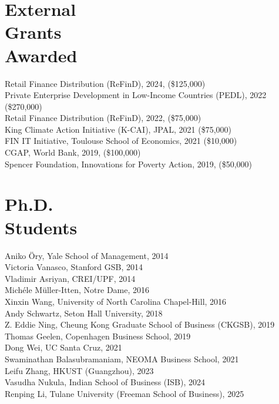 \documentclass[margin,line,11pt]{resume}
\begin{document}
\begin{resume}
        \section{\mysidestyle External \\ Grants \\ Awarded}
         Retail Finance Distribution (ReFinD), 2024, (\$125,000) \\
         Private Enterprise Development in Low-Income Countries (PEDL), 2022 (\$270,000) \\
         Retail Finance Distribution (ReFinD), 2022, (\$75,000) \\
         King Climate Action Initiative (K-CAI), JPAL, 2021 (\$75,000)  \\
         FIN IT Initiative, Toulouse School of Economics, 2021 (\$10,000)  \\
         CGAP, World Bank, 2019, (\$100,000)\\
         Spencer Foundation, Innovations for Poverty Action, 2019, (\$50,000)


\section{\mysidestyle Ph.D. \\ Students} 
Aniko \"{O}ry, Yale School of Management, 2014 \\
Victoria Vanasco, Stanford GSB, 2014 \\
Vladimir Asriyan, CREI/UPF, 2014 \\
Mich\'{e}le M\"{u}ller-Itten, Notre Dame, 2016 \\
Xinxin Wang, University of North Carolina Chapel-Hill, 2016 \\
Andy Schwartz, Seton Hall University, 2018 \\
Z. Eddie Ning, Cheung Kong Graduate School of Business (CKGSB), 2019 \\
Thomas Geelen, Copenhagen Business School, 2019 \\
Dong Wei, UC Santa Cruz, 2021 \\
Swaminathan Balasubramaniam, NEOMA Business School, 2021 \\
Leifu Zhang, HKUST (Guangzhou), 2023 \\
Vasudha Nukula, Indian School of Business (ISB), 2024 \\
Renping Li, Tulane University (Freeman School of Business), 2025 \\




\end{resume}
\end{document}
